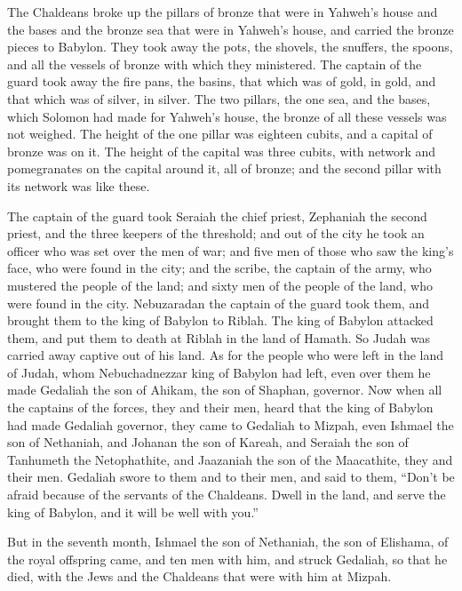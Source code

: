 {The Chaldeans broke up the pillars of bronze that were in Yahweh’s house and the bases and the bronze sea that were in Yahweh’s house, and carried the bronze pieces to Babylon.
They took away the pots, the shovels, the snuffers, the spoons, and all the vessels of bronze with which they ministered.
The captain of the guard took away the fire pans, the basins, that which was of gold, in gold, and that which was of silver, in silver.
The two pillars, the one sea, and the bases, which Solomon had made for Yahweh’s house, the bronze of all these vessels was not weighed.
The height of the one pillar was eighteen cubits, and a capital of bronze was on it. The height of the capital was three cubits, with network and pomegranates on the capital around it, all of bronze; and the second pillar with its network was like these.
\par }{\PP {}The captain of the guard took Seraiah the chief priest, Zephaniah the second priest, and the three keepers of the threshold;
and out of the city he took an officer who was set over the men of war; and five men of those who saw the king’s face, who were found in the city; and the scribe, the captain of the army, who mustered the people of the land; and sixty men of the people of the land, who were found in the city.
Nebuzaradan the captain of the guard took them, and brought them to the king of Babylon to Riblah.
The king of Babylon attacked them, and put them to death at Riblah in the land of Hamath. So Judah was carried away captive out of his land.
As for the people who were left in the land of Judah, whom Nebuchadnezzar king of Babylon had left, even over them he made Gedaliah the son of Ahikam, the son of Shaphan, governor.
Now when all the captains of the forces, they and their men, heard that the king of Babylon had made Gedaliah governor, they came to Gedaliah to Mizpah, even Ishmael the son of Nethaniah, and Johanan the son of Kareah, and Seraiah the son of Tanhumeth the Netophathite, and Jaazaniah the son of the Maacathite, they and their men.
Gedaliah swore to them and to their men, and said to them, “Don’t be afraid because of the servants of the Chaldeans. Dwell in the land, and serve the king of Babylon, and it will be well with you.”
\par }{\PP {}But in the seventh month, Ishmael the son of Nethaniah, the son of Elishama, of the royal offspring came, and ten men with him, and struck Gedaliah, so that he died, with the Jews and the Chaldeans that were with him at Mizpah.
}
